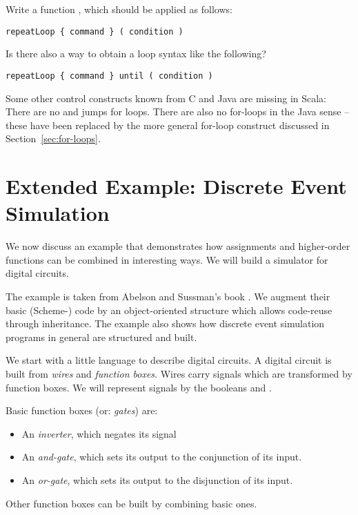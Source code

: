 {\begin{exercise} Write a function , which should be 
applied as follows:
\begin{lstlisting}
repeatLoop { command } ( condition )
\end{lstlisting}
Is there also a way to obtain a loop syntax like the following?
\begin{lstlisting}
repeatLoop { command } until ( condition )
\end{lstlisting}
\end{exercise}

Some other control constructs known from C and Java are missing in
Scala: There are no  and  jumps for loops.
There are also no for-loops in the Java sense -- these have been
replaced by the more general for-loop construct discussed in
Section~\ref{sec:for-loops}.

\section{Extended Example: Discrete Event Simulation}

We now discuss an example that demonstrates how assignments and
higher-order functions can be combined in interesting ways.  
We will build a simulator for digital circuits.

The example is taken from Abelson and Sussman's book
\cite{abelson-sussman:structure}. We augment their basic (Scheme-)
code by an object-oriented structure which allows code-reuse through
inheritance. The example also shows how discrete event simulation programs
in general are structured and built.

We start with a little language to describe digital circuits.
A digital circuit is built from {\em wires} and {\em function boxes}.
Wires carry signals which are transformed by function boxes.
We will represent signals by the booleans  and
.

Basic function boxes (or: {\em gates}) are:
\begin{itemize}
\item An \emph{inverter}, which negates its signal
\item An \emph{and-gate}, which sets its output to the conjunction of its input.
\item An \emph{or-gate}, which sets its output to the disjunction of its
input.
\end{itemize}
Other function boxes can be built by combining basic ones.

}

